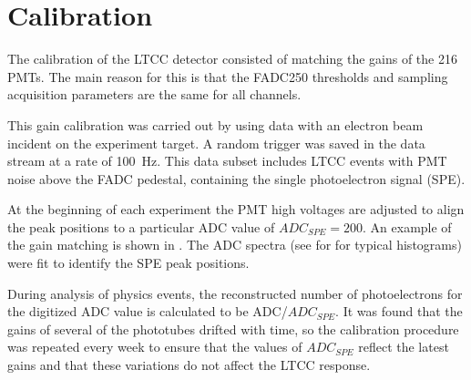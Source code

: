 \section{Calibration}

The calibration of the LTCC detector consisted of matching the gains of the 216 PMTs. The main reason for this
is that the FADC250 thresholds and sampling acquisition parameters are the same for all channels.

This gain calibration was carried out by using data with an electron beam incident on the experiment target. A
random trigger was saved in the data stream at a rate of 100~Hz. This data subset includes LTCC events with
PMT noise above the FADC pedestal, containing the single photoelectron signal (SPE).

At the beginning of each experiment the PMT high voltages are adjusted to align the peak positions to a particular
ADC value of $ADC_{SPE} = 200$. An example of the gain matching is shown in . The ADC spectra
(see for  for typical histograms) were fit to identify the SPE peak positions.

During analysis of physics events, the reconstructed number of photoelectrons for the digitized ADC value is
calculated to be ADC/$ADC_{SPE}$. It was found that the gains of several of the phototubes drifted with time, so
the calibration procedure was repeated every week to ensure that the values of $ADC_{SPE}$ reflect the latest
gains and that these variations do not affect the LTCC response.

